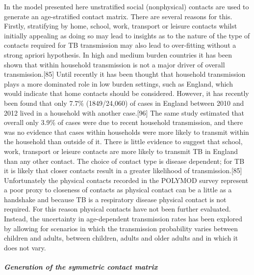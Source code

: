 \documentclass[11pt,twoside]{bristolthesis}
\begin{document}
  In the model presented here unstratified social (nonphysical) contacts are used to generate an age-stratified contact matrix. There are several reasons for this. Firstly, stratifying by home, school, work, transport or leisure contacts whilst initially appealing as doing so may lead to insights as to the nature of the type of contacts required for TB transmission may also lead to over-fitting without a strong apriori hypothesis. In high and medium burden countries it has been shown that within household transmission is not a major driver of overall transmission.{[}85{]} Until recently it has been thought that household transmission plays a more dominated role in low burden settings, such as England, which would indicate that home contacts should be considered. However, it has recently been found that only 7.7\% (1849/24,060) of cases in England between 2010 and 2012 lived in a household with another case.{[}96{]} The same study estimated that overall only 3.9\% of cases were due to recent household transmission, and there was no evidence that cases within households were more likely to transmit within the household than outside of it. There is little evidence to suggest that school, work, transport or leisure contacts are more likely to transmit TB in England than any other contact. The choice of contact type is disease dependent; for TB it is likely that closer contacts result in a greater likelihood of transmission.{[}85{]} Unfortunately the physical contacts recorded in the POLYMOD survey represent a poor proxy to closeness of contacts as physical contact can be a little as a handshake and because TB is a respiratory disease physical contact is not required. For this reason physical contacts have not been further evaluated. Instead, the uncertainty in age-dependent transmission rates has been explored by allowing for scenarios in which the transmission probability varies between children and adults, between children, adults and older adults and in which it does not vary.
  
  \hypertarget{generation-of-the-symmetric-contact-matrix}{%
  \subparagraph{Generation of the symmetric contact matrix}\label{generation-of-the-symmetric-contact-matrix}}
  
\end{document}
